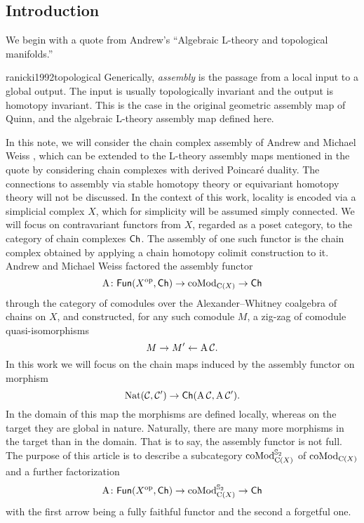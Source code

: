 
\subsection{Introduction} \label{ss:introduction}

We begin with a quote from Andrew's ``Algebraic L-theory and topological manifolds.''
\begin{displaycquote}{ranicki1992topological}
	Generically, \textit{assembly} is the passage from a local input to a global output.
	The input is usually topologically invariant and the output is homotopy invariant.
	This is the case in the original geometric assembly map of Quinn, and the algebraic L-theory assembly map defined here.
\end{displaycquote}
In this note, we will consider the chain complex assembly of Andrew and Michael Weiss \cite{ranicki1990assembly}, which can be extended to the L-theory assembly maps mentioned in the quote by considering chain complexes with derived Poincar\'e duality.
The connections to assembly via stable homotopy theory \cite{weiss1995asssembly} or equivariant homotopy theory \cite{davis1998assembly} will not be discussed.
In the context of this work, locality is encoded via a simplicial complex $X$, which for simplicity will be assumed simply connected.
We will focus on contravariant functors from $X$, regarded as a poset category, to the category of chain complexes $\mathsf{Ch}$.
The assembly of one such functor is the chain complex obtained by applying a chain homotopy colimit construction to it.
Andrew and Michael Weiss factored the assembly functor
\[
\operatorname{A} \colon \mathsf{Fun}(X^{\mathrm{op}}, \mathsf{Ch}) \to \operatorname{coMod}_{\operatorname{C}(X)} \to \mathsf{Ch}
\]
through the category of comodules over the Alexander--Whitney coalgebra of chains on $X$, and constructed, for any such comodule $M$, a zig-zag of comodule quasi-isomorphisms
\[
M \to M' \leftarrow \operatorname{A} \mathcal{C}.
\]
In this work we will focus on the chain maps induced by the assembly functor on morphism
\[
\operatorname{Nat}(\mathcal{C},\mathcal{C}') \to \mathsf{Ch}(\operatorname{A} \mathcal{C}, \operatorname{A} \mathcal{C}').
\]
In the domain of this map the morphisms are defined locally, whereas on the target they are global in nature.
Naturally, there are many more morphisms in the target than in the domain.
That is to say, the assembly functor is not full.
The purpose of this article is to describe a subcategory $\operatorname{coMod}^{\mathbb{S}_2}_{\operatorname{C}(X)}$ of $\operatorname{coMod}_{\operatorname{C}(X)}$ and a further factorization
\[
\operatorname{A} \colon \mathsf{Fun}(X^{\mathrm{op}}, \mathsf{Ch}) \to \operatorname{coMod}^{\mathbb{S}_2}_{\operatorname{C}(X)} \to \mathsf{Ch}
\]
with the first arrow being a fully faithful functor and the second a forgetful one.

